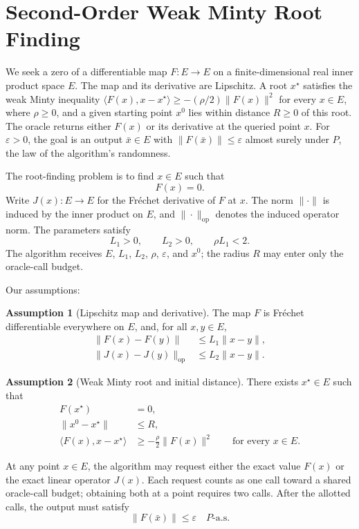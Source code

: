 \documentclass[10pt]{article}
\theoremstyle{definition}
\newtheorem{assumption}{Assumption}
\begin{document}
\section*{Second-Order Weak Minty Root Finding}
We seek a zero of a differentiable map $F:E\to E$ on a finite-dimensional real inner product space $E$. The map and its derivative are Lipschitz. A root $x^\star$ satisfies the weak Minty inequality $\langle F(x),x-x^\star\rangle\geq-(\rho/2)\|F(x)\|^2$ for every $x\in E$, where $\rho\geq0$, and a given starting point $x^0$ lies within distance $R\geq0$ of this root. The oracle returns either $F(x)$ or its derivative at the queried point $x$. For $\varepsilon>0$, the goal is an output $\bar{x}\in E$ with $\|F(\bar{x})\|\leq\varepsilon$ almost surely under $P$, the law of the algorithm's randomness.

The root-finding problem is to find $x\in E$ such that
\[
F(x)=0.
\]
Write $J(x):E\to E$ for the Fr\'echet derivative of $F$ at $x$. The norm $\|\cdot\|$ is induced by the inner product on $E$, and $\|\cdot\|_{\mathrm{op}}$ denotes the induced operator norm. The parameters satisfy
\[
L_1>0,\qquad L_2>0,\qquad \rho L_1<2.
\]
The algorithm receives $E$, $L_1$, $L_2$, $\rho$, $\varepsilon$, and $x^0$; the radius $R$ may enter only the oracle-call budget.

Our assumptions:
\begin{assumption}[Lipschitz map and derivative]
The map $F$ is Fr\'echet differentiable everywhere on $E$, and, for all $x,y\in E$,
\[
\begin{aligned}
\|F(x)-F(y)\|&\leq L_1\|x-y\|,\\
\|J(x)-J(y)\|_{\mathrm{op}}&\leq L_2\|x-y\|.
\end{aligned}
\]
\end{assumption}

\begin{assumption}[Weak Minty root and initial distance]
There exists $x^\star\in E$ such that
\[
\begin{aligned}
F(x^\star)&=0,\\
\|x^0-x^\star\|&\leq R,\\
\langle F(x),x-x^\star\rangle
&\geq-\frac{\rho}{2}\|F(x)\|^2
\qquad\text{for every }x\in E.
\end{aligned}
\]
\end{assumption}

At any point $x\in E$, the algorithm may request either the exact value $F(x)$ or the exact linear operator $J(x)$. Each request counts as one call toward a shared oracle-call budget; obtaining both at a point requires two calls. After the allotted calls, the output must satisfy
\[
\|F(\bar{x})\|\leq\varepsilon
\quad P\text{-a.s.}
\]
\end{document}
